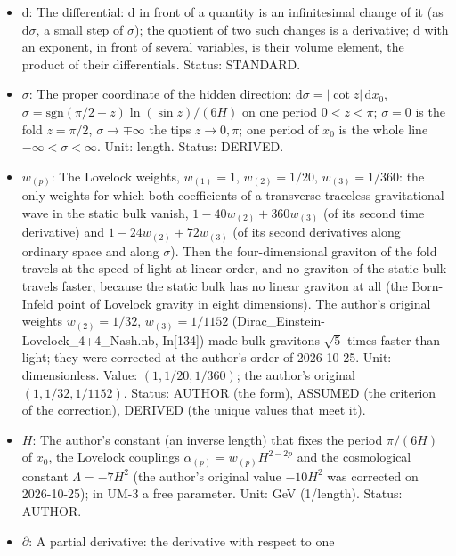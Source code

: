 \documentclass[
  10pt,
]{article}
\providecommand{\tightlist}{%
  \setlength{\itemsep}{0pt}\setlength{\parskip}{0pt}}
\begin{document}
\begin{itemize}
\tightlist
\item
  \(\mathrm{d}\): The differential: \(\mathrm{d}\) in front of a
  quantity is an infinitesimal change of it (as \(\mathrm{d}\sigma\), a
  small step of \(\sigma\)); the quotient of two such changes is a
  derivative; \(\mathrm{d}\) with an exponent, in front of several
  variables, is their volume element, the product of their
  differentials. Status: STANDARD.
\item
  \(\sigma\): The proper coordinate of the hidden direction:
  \(\mathrm{d}\sigma = \lvert\cot z\rvert\,\mathrm{d}x_0\),
  \(\sigma = \mathrm{sgn}(\pi/2 - z)\ln(\sin z)/(6H)\) on one period
  \(0 < z < \pi\); \(\sigma = 0\) is the fold \(z = \pi/2\),
  \(\sigma \to \mp\infty\) the tips \(z \to 0, \pi\); one period of
  \(x_0\) is the whole line \(-\infty < \sigma < \infty\). Unit: length.
  Status: DERIVED.
\item
  \(w_{(p)}\): The Lovelock weights, \(w_{(1)} = 1\),
  \(w_{(2)} = 1/20\), \(w_{(3)} = 1/360\): the only weights for which
  both coefficients of a transverse traceless gravitational wave in the
  static bulk vanish, \(1 - 40w_{(2)} + 360w_{(3)}\) (of its second time
  derivative) and \(1 - 24w_{(2)} + 72w_{(3)}\) (of its second
  derivatives along ordinary space and along \(\sigma\)). Then the
  four-dimensional graviton of the fold travels at the speed of light at
  linear order, and no graviton of the static bulk travels faster,
  because the static bulk has no linear graviton at all (the Born-Infeld
  point of Lovelock gravity in eight dimensions). The author's original
  weights \(w_{(2)} = 1/32\), \(w_{(3)} = 1/1152\)
  (Dirac\_Einstein-Lovelock\_4+4\_Nash.nb, In{[}134{]}) made bulk
  gravitons \(\sqrt5\) times faster than light; they were corrected at
  the author's order of 2026-10-25. Unit: dimensionless. Value:
  \((1, 1/20, 1/360)\); the author's original \((1, 1/32, 1/1152)\).
  Status: AUTHOR (the form), ASSUMED (the criterion of the correction),
  DERIVED (the unique values that meet it).
\item
  \(H\): The author's constant (an inverse length) that fixes the period
  \(\pi/(6H)\) of \(x_0\), the Lovelock couplings
  \(\alpha_{(p)} = w_{(p)}H^{2-2p}\) and the cosmological constant
  \(\Lambda = -7H^2\) (the author's original value \(-10H^2\) was
  corrected on 2026-10-25); in UM-3 a free parameter. Unit: GeV
  (1/length). Status: AUTHOR.
\item
  \(\partial\): A partial derivative: the derivative with respect to one

\end{itemize}
\end{document}
